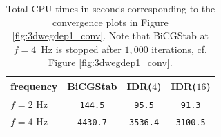 \begin{table}[ht]
  \caption{Total CPU times in seconds corresponding to the convergence plots in Figure \ref{fig:3dwegdep1_conv}. Note that BiCGStab at \mbox{$f=4$ Hz} is stopped after $1,000$ iterations, cf. Figure \ref{fig:3dwegdep1_conv}.}\label{tab:cputime3d}
 \centering
 \begin{tabular}{|l|ccc|}
  \hline
  frequency & BiCGStab & IDR($4$) & IDR($16$)\\
  \hline
  $f=2$ Hz & \phantom{0}\texttt{144.5} & \phantom{00}\texttt{95.5} & \phantom{00}\texttt{91.3}\\
  $f=4$ Hz & \texttt{4430.7} & \texttt{3536.4} & \texttt{3100.5}\\
  \hline
 \end{tabular}
\end{table}

